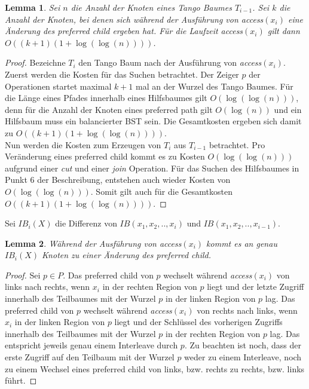 \documentclass[a4paper,12pt]{article}
\newtheorem{Lemma}{Lemma}[section]
\begin{document}
 
\begin{Lemma} \label{demaineLemma4}
	Sei $n$ die Anzahl der Knoten eines Tango Baumes $T_{i-1}$. Sei $k$ die Anzahl der Knoten, bei denen sich während der Ausführung von \textit{access}$\left(x_i\right)$ eine Änderung des preferred child ergeben hat. Für die Laufzeit \textit{access}$\left(x_i\right)$ gilt dann $O\left(\left(k + 1\right) \left(1 + \log \left( \log  \left(n \right)\right)\right)\right)$.
\end{Lemma}
\begin{proof}
	Bezeichne $T_i$ den Tango Baum nach der Ausführung von \textit{access}$\left(x_i\right)$. Zuerst werden die Kosten für das Suchen betrachtet. Der Zeiger $p$ der Operationen startet maximal $k + 1$ mal an der Wurzel des Tango Baumes. Für die Länge eines Pfades innerhalb eines Hilfsbaumes gilt $O\left(\log \left( \log  \left(n \right)\right)\right)$, denn für die Anzahl der Knoten eines preferred path gilt $O\left( \log \left(n\right)  \right)$ und ein Hilfsbaum muss ein balancierter BST sein. Die Gesamtkosten ergeben sich damit zu $O\left(\left(k + 1\right) \left(1 + \log \left( \log  \left(n \right)\right)\right)\right)$.\\
	Nun werden die Kosten zum Erzeugen von $T_i$ aus $T_{i-1}$ betrachtet. Pro Veränderung eines preferred child kommt es zu Kosten $O\left( \log\left(\log \left(n\right)\right)\right)$ aufgrund einer \textit{cut} und einer \textit{join} Operation. Für das Suchen des Hilfsbaumes in Punkt $6$ der Beschreibung, entstehen auch wieder Kosten von $O\left(\log \left( \log  \left(n \right)\right)\right)$. Somit gilt auch für die Gesamtkosten $O\left(\left(k + 1\right) \left(1 + \log \left( \log  \left(n \right)\right)\right)\right)$.
	
	
\end{proof}
\noindent Sei $\mathit{IB}_i\left(X\right)$ die Differenz von $\mathit{IB}\left(x_1, x_2,..,x_i\right)$ und  $\mathit{IB}\left(x_1, x_2,..,x_{i-1}\right)$. 

\begin{Lemma} \label{demaineLemma5}
	Während der Ausführung von \textit{access}$\left(x_i\right)$ kommt es an genau $\mathit{IB}_i\left(X\right)$ Knoten zu einer Änderung des preferred child.
\end{Lemma}
\begin{proof}
	Sei $p \in P$. Das preferred child von $p$ wechselt während  \textit{access}$\left(x_i\right)$ von links nach rechts,  wenn $x_i$ in der rechten Region von $p$ liegt und der letzte Zugriff innerhalb des Teilbaumes mit der Wurzel $p$ in der linken Region von $p$ lag.  Das preferred child von $p$ wechselt während  \textit{access}$\left(x_i\right)$ von rechts nach links,  wenn $x_i$ in der linken Region von $p$ liegt und der Schlüssel des vorherigen Zugriffs innerhalb des Teilbaumes mit der Wurzel $p$ in der rechten Region von $p$ lag. Das entspricht jeweils genau einem Interleave durch $p$. Zu beachten ist noch, dass der erste Zugriff auf den Teilbaum mit der Wurzel $p$ weder zu einem Interleave, noch zu einem Wechsel eines preferred child von links, bzw. rechts zu rechts, bzw. links führt. 	
\end{proof}
\end{document}
